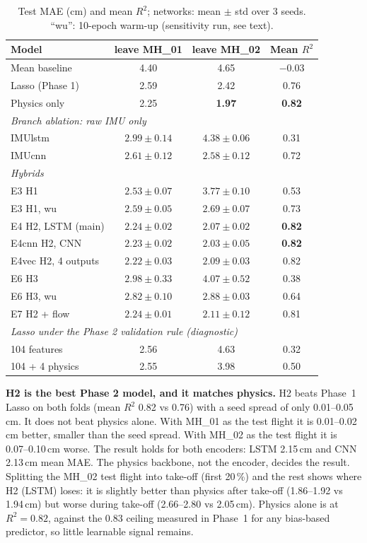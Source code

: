 \begin{table}[t]
\centering
\caption{Test MAE (cm) and mean $R^2$; networks: mean $\pm$ std over 3
seeds. ``wu'': 10-epoch warm-up (sensitivity run, see text).}
\label{tab:hybrid}
\begin{tabular}{lccc}
\hline
Model & leave MH\_01 & leave MH\_02 & Mean $R^2$ \\
\hline
Mean baseline & 4.40 & 4.65 & $-0.03$ \\
Lasso (Phase 1) & 2.59 & 2.42 & 0.76 \\
Physics only & 2.25 & \textbf{1.97} & \textbf{0.82} \\
\hline
\multicolumn{4}{l}{\emph{Branch ablation: raw IMU only}} \\
IMUlstm & $2.99\pm0.14$ & $4.38\pm0.06$ & 0.31 \\
IMUcnn & $2.61\pm0.12$ & $2.58\pm0.12$ & 0.72 \\
\hline
\multicolumn{4}{l}{\emph{Hybrids}} \\
E3 H1 & $2.53\pm0.07$ & $3.77\pm0.10$ & 0.53 \\
E3 H1, wu & $2.59\pm0.05$ & $2.69\pm0.07$ & 0.73 \\
E4 H2, LSTM (main) & $2.24\pm0.02$ & $2.07\pm0.02$ & \textbf{0.82} \\
E4cnn H2, CNN & $\mathbf{2.23\pm0.02}$ & $2.03\pm0.05$ & \textbf{0.82} \\
E4vec H2, 4 outputs & $2.22\pm0.03$ & $2.09\pm0.03$ & 0.82 \\
E6 H3 & $2.98\pm0.33$ & $4.07\pm0.52$ & 0.38 \\
E6 H3, wu & $2.82\pm0.10$ & $2.88\pm0.03$ & 0.64 \\
E7 H2 + flow & $2.24\pm0.01$ & $2.11\pm0.12$ & 0.81 \\
\hline
\multicolumn{4}{l}{\emph{Lasso under the Phase 2 validation rule (diagnostic)}} \\
104 features & 2.56 & 4.63 & 0.32 \\
104 + 4 physics & 2.55 & 3.98 & 0.50 \\
\hline
\end{tabular}
\end{table}

\textbf{H2 is the best Phase 2 model, and it matches physics.} H2 beats
Phase~1 Lasso on both folds (mean $R^2$ 0.82 vs 0.76) with a seed spread
of only 0.01--0.05\,cm. It does not beat physics alone. With MH\_01 as
the test flight it is 0.01--0.02\,cm better, smaller than the seed
spread. With MH\_02 as the test flight it is 0.07--0.10\,cm worse. The
result holds for both encoders: LSTM 2.15\,cm and CNN 2.13\,cm mean MAE.
The physics backbone, not the encoder, decides the result. Splitting the
MH\_02 test flight into take-off (first 20\,\%) and the rest shows where
H2 (LSTM) loses: it is slightly better than physics after take-off
(1.86--1.92 vs 1.94\,cm) but worse during take-off (2.66--2.80 vs
2.05\,cm). Physics alone is at $R^2=0.82$, against the 0.83 ceiling
measured in Phase~1 for any bias-based predictor, so little learnable
signal remains.


